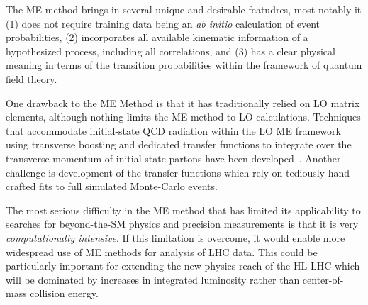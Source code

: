 
The ME method brings in several unique and desirable featudres, most notably it (1) does not require training data being an \emph{ab initio} calculation of event probabilities, (2) incorporates all available kinematic information of a hypothesized process, including all correlations, and (3) has a clear physical meaning in terms of the transition probabilities within the framework of quantum field theory.

One drawback to the ME Method is that it has traditionally relied on LO matrix elements, although nothing limits the ME method to LO calculations. Techniques that accommodate initial-state QCD radiation within the LO ME framework using transverse boosting and dedicated transfer functions to integrate over the transverse momentum of initial-state partons have been developed~\cite{Alwall:2010cq}.
Another challenge is development of the transfer functions which rely on tediously hand-crafted fits to full simulated Monte-Carlo events.

The most serious difficulty in the ME method that has limited its applicability to searches for beyond-the-SM physics and precision measurements is that it is very \emph{computationally intensive}. If this limitation is overcome, it would enable more widespread use of ME methods for analysis of LHC data. This could be particularly important for extending the new physics reach of the HL-LHC which will be dominated by increases in integrated luminosity rather than center-of-mass collision energy.

